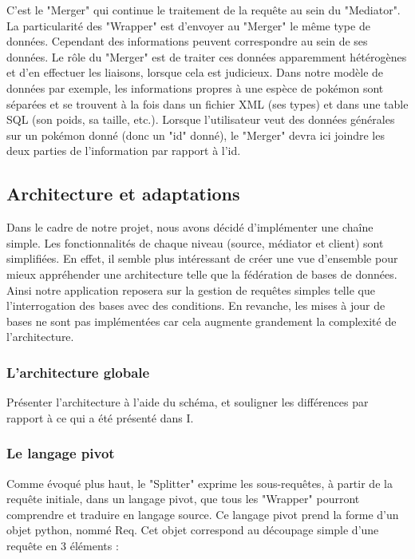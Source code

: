C'est le "Merger" qui continue le traitement de la requête au sein du "Mediator". La particularité des "Wrapper" est d'envoyer au "Merger" le même type de données. Cependant des informations peuvent correspondre au sein de ses données. Le rôle du "Merger" est de traiter ces données apparemment hétérogènes et d'en effectuer les liaisons, lorsque cela est judicieux. Dans notre modèle de données par exemple, les informations propres à une espèce de pokémon sont séparées et se trouvent à la fois dans un fichier XML (ses types) et dans une table SQL (son poids, sa taille, etc.). Lorsque l'utilisateur veut des données générales sur un pokémon donné (donc un "id" donné), le "Merger" devra ici joindre les deux parties de l'information par rapport à l'id. 

\subsection{Architecture et adaptations}

Dans le cadre de notre projet, nous avons décidé d'implémenter une chaîne simple. Les fonctionnalités de chaque niveau (source, médiator et client) sont simplifiées. En effet, il semble plus intéressant de créer une vue d'ensemble pour mieux appréhender une architecture telle que la fédération de bases de données. Ainsi notre application reposera sur la gestion de requêtes simples telle que l'interrogation des bases avec des conditions. En revanche, les mises à jour de bases ne sont pas implémentées car cela augmente grandement la complexité de l'architecture.

\subsubsection{L'architecture globale}


Présenter l'architecture à l'aide du schéma, et souligner les différences par rapport à ce qui a été présenté dans I.

\subsubsection{Le langage pivot}

Comme évoqué plus haut, le "Splitter" exprime les sous-requêtes, à partir de la requête initiale, dans un langage pivot, que tous les "Wrapper" pourront comprendre et traduire en langage source. Ce langage pivot prend la forme d'un objet python, nommé Req. Cet objet correspond au découpage simple d'une requête en 3 éléments :


